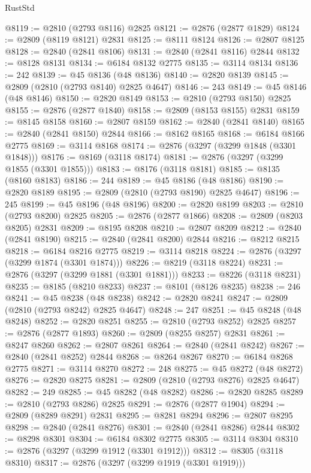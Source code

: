 \begin{lexlean}{RustStd}
\begin{coremodule}
{\begin{coremodule}
{{{{{{{{{{{{{{{{{{{{{{{{{{{{{{{{{@8119 := @2810 (@2793 @8116) @2825
@8121 := @2876 (@2877 @1829)
@8124 := @2809 (@8119 @8121) @2831
@8125 := @8111 @8124
@8126 := @2807 @8125
@8128 := @2840 (@2841 @8106)
@8131 := @2840 (@2841 @8116) @2844
@8132 := @8128 @8131
@8134 := @6184 @8132 @2775
@8135 := @3114 @8134
@8136 := 242
@8139 := @45 @8136 (@48 @8136)
@8140 := @2820 @8139
@8145 := @2809 (@2810 (@2793 @8140) @2825 @4647)
@8146 := 243
@8149 := @45 @8146 (@48 @8146)
@8150 := @2820 @8149
@8153 := @2810 (@2793 @8150) @2825
@8155 := @2876 (@2877 @1840)
@8158 := @2809 (@8153 @8155) @2831
@8159 := @8145 @8158
@8160 := @2807 @8159
@8162 := @2840 (@2841 @8140)
@8165 := @2840 (@2841 @8150) @2844
@8166 := @8162 @8165
@8168 := @6184 @8166 @2775
@8169 := @3114 @8168
@8174 := @2876 (@3297 (@3299 @1848 (@3301 @1848)))
@8176 := @8169 (@3118 @8174)
@8181 := @2876 (@3297 (@3299 @1855 (@3301 @1855)))
@8183 := @8176 (@3118 @8181)
@8185 := @8135 (@8160 @8183)
@8186 := 244
@8189 := @45 @8186 (@48 @8186)
@8190 := @2820 @8189
@8195 := @2809 (@2810 (@2793 @8190) @2825 @4647)
@8196 := 245
@8199 := @45 @8196 (@48 @8196)
@8200 := @2820 @8199
@8203 := @2810 (@2793 @8200) @2825
@8205 := @2876 (@2877 @1866)
@8208 := @2809 (@8203 @8205) @2831
@8209 := @8195 @8208
@8210 := @2807 @8209
@8212 := @2840 (@2841 @8190)
@8215 := @2840 (@2841 @8200) @2844
@8216 := @8212 @8215
@8218 := @6184 @8216 @2775
@8219 := @3114 @8218
@8224 := @2876 (@3297 (@3299 @1874 (@3301 @1874)))
@8226 := @8219 (@3118 @8224)
@8231 := @2876 (@3297 (@3299 @1881 (@3301 @1881)))
@8233 := @8226 (@3118 @8231)
@8235 := @8185 (@8210 @8233)
@8237 := @8101 (@8126 @8235)
@8238 := 246
@8241 := @45 @8238 (@48 @8238)
@8242 := @2820 @8241
@8247 := @2809 (@2810 (@2793 @8242) @2825 @4647)
@8248 := 247
@8251 := @45 @8248 (@48 @8248)
@8252 := @2820 @8251
@8255 := @2810 (@2793 @8252) @2825
@8257 := @2876 (@2877 @1893)
@8260 := @2809 (@8255 @8257) @2831
@8261 := @8247 @8260
@8262 := @2807 @8261
@8264 := @2840 (@2841 @8242)
@8267 := @2840 (@2841 @8252) @2844
@8268 := @8264 @8267
@8270 := @6184 @8268 @2775
@8271 := @3114 @8270
@8272 := 248
@8275 := @45 @8272 (@48 @8272)
@8276 := @2820 @8275
@8281 := @2809 (@2810 (@2793 @8276) @2825 @4647)
@8282 := 249
@8285 := @45 @8282 (@48 @8282)
@8286 := @2820 @8285
@8289 := @2810 (@2793 @8286) @2825
@8291 := @2876 (@2877 @1904)
@8294 := @2809 (@8289 @8291) @2831
@8295 := @8281 @8294
@8296 := @2807 @8295
@8298 := @2840 (@2841 @8276)
@8301 := @2840 (@2841 @8286) @2844
@8302 := @8298 @8301
@8304 := @6184 @8302 @2775
@8305 := @3114 @8304
@8310 := @2876 (@3297 (@3299 @1912 (@3301 @1912)))
@8312 := @8305 (@3118 @8310)
@8317 := @2876 (@3297 (@3299 @1919 (@3301 @1919)))
}}}}}}}}}}}}}}}}}}}}}}}}}}}}}}}}}
\end{coremodule}}
\end{coremodule}
\end{lexlean}
